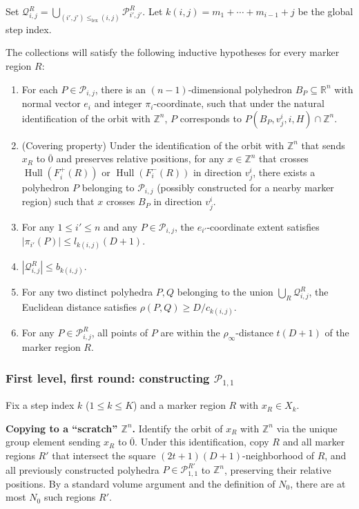 \documentclass[10pt,a4paper]{amsart}
\DeclareMathOperator{\Hull}{Hull}
\begin{document}
Set
$\mathcal{Q}_{i,j}^R=
\bigcup_{(i',j')\leq_{\text{lex}}(i,j)}\mathcal{P}_{i',j'}^R$.
Let $k(i,j)=m_1+\cdots+m_{i-1}+j$ be the global step index.

The collections will satisfy the following inductive hypotheses for every
marker region $R$:

\begin{enumerate}
\item[(I1)] For each $P\in\mathcal{P}_{i,j}$, there is an
$(n-1)$-dimensional polyhedron $B_P\subseteq\mathbb{R}^n$ with normal
vector $e_i$ and integer $\pi_i$-coordinate, such that under the natural
identification of the orbit with $\mathbb{Z}^n$, $P$ corresponds to
$P(B_P, v_j^i, i, H)\cap\mathbb{Z}^n$.

\item[(I2)] (Covering property) Under the identification of the orbit
with $\mathbb{Z}^n$ that sends $x_R$ to $\overline{0}$ and preserves
relative positions, for any $x\in\mathbb{Z}^n$ that crosses
$\Hull(F_i^+(R))$ or $\Hull(F_i^-(R))$ in direction $v_j^i$, there
exists a polyhedron $P$ belonging to $\mathcal{P}_{i,j}$ (possibly
constructed for a nearby marker region) such that $x$ crosses $B_P$ in
direction $v_j^i$.

\item[(I3)] For any $1\leq i'\leq n$ and any $P\in\mathcal{P}_{i,j}$,
the $e_{i'}$-coordinate extent satisfies
$|\pi_{i'}(P)|\leq l_{k(i,j)}(D+1)$.

\item[(I4)] $|\mathcal{Q}_{i,j}^R|\leq b_{k(i,j)}$.

\item[(I5)] For any two distinct polyhedra $P, Q$ belonging to the union
$\bigcup_{R}\mathcal{Q}_{i,j}^R$, the Euclidean
distance satisfies $\rho(P,Q)\geq D/c_{k(i,j)}$.

\item[(I6)] For any $P\in\mathcal{P}_{i,j}^R$, all points of $P$ are
within the $\rho_\infty$-distance $t(D+1)$ of the marker region $R$.
\end{enumerate}

\subsubsection{First level, first round: constructing $\mathcal{P}_{1,1}$}

Fix a step index $k$ ($1\leq k\leq K$) and a marker region $R$ with
$x_R\in X_k$.

\medskip
\noindent\textbf{Copying to a ``scratch'' $\mathbb{Z}^n$.}
Identify the orbit of $x_R$ with $\mathbb{Z}^n$ via the unique group
element sending $x_R$ to $\overline{0}$. Under this identification,
copy $R$ and all marker regions $R'$ that intersect the square
$(2t+1)(D+1)$-neighborhood of $R$, and
all previously constructed polyhedra
$P\in\mathcal{P}_{1,1}^{R'}$ to
$\mathbb{Z}^n$, preserving their relative positions. By a standard volume
argument and the definition of $N_0$, there are at most $N_0$ such
regions $R'$.
\end{document}
